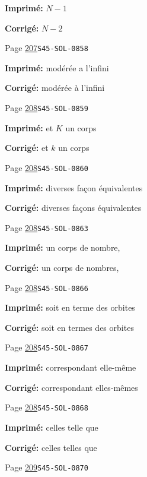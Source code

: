 \documentclass[oneside]{book}
\theoremstyle{sga-source}
\theoremstyle{sga-source-dash}
\theoremstyle{sga-source-dotdash}
\theoremstyle{sga-source-number-note-dash}
\theoremstyle{sga-source-note-number-dotdash}
\theoremstyle{sga-source-example-dotdash}
\theoremstyle{sga-source-inline-number}
\theoremstyle{sga-source-bare-number}
\theoremstyle{sga-source}
\begin{document}
\begin{description}
\par\noindent\textbf{Imprimé:} \(N-1\)
\par\noindent\textbf{Corrigé:} \(N-2\)
\smallskip
\item[\hypertarget{apparatus:FR-0204}{204}] Page \hyperlink{printpage:fr:207}{207}\quad\texttt{S45-SOL-0858}
\par\noindent\textbf{Imprimé:} modérée a l'infini
\par\noindent\textbf{Corrigé:} modérée à l'infini
\smallskip
\item[\hypertarget{apparatus:FR-0205}{205}] Page \hyperlink{printpage:fr:208}{208}\quad\texttt{S45-SOL-0859}
\par\noindent\textbf{Imprimé:} et $K$ un corps
\par\noindent\textbf{Corrigé:} et $k$ un corps
\smallskip
\item[\hypertarget{apparatus:FR-0206}{206}] Page \hyperlink{printpage:fr:208}{208}\quad\texttt{S45-SOL-0860}
\par\noindent\textbf{Imprimé:} diverses façon équivalentes
\par\noindent\textbf{Corrigé:} diverses façons équivalentes
\smallskip
\item[\hypertarget{apparatus:FR-0207}{207}] Page \hyperlink{printpage:fr:208}{208}\quad\texttt{S45-SOL-0863}
\par\noindent\textbf{Imprimé:} un corps de nombre,
\par\noindent\textbf{Corrigé:} un corps de nombres,
\smallskip
\item[\hypertarget{apparatus:FR-0208}{208}] Page \hyperlink{printpage:fr:208}{208}\quad\texttt{S45-SOL-0866}
\par\noindent\textbf{Imprimé:} soit en terme des orbites
\par\noindent\textbf{Corrigé:} soit en termes des orbites
\smallskip
\item[\hypertarget{apparatus:FR-0209}{209}] Page \hyperlink{printpage:fr:208}{208}\quad\texttt{S45-SOL-0867}
\par\noindent\textbf{Imprimé:} correspondant elle-même
\par\noindent\textbf{Corrigé:} correspondant elles-mêmes
\smallskip
\item[\hypertarget{apparatus:FR-0210}{210}] Page \hyperlink{printpage:fr:208}{208}\quad\texttt{S45-SOL-0868}
\par\noindent\textbf{Imprimé:} celles telle que
\par\noindent\textbf{Corrigé:} celles telles que
\smallskip
\item[\hypertarget{apparatus:FR-0211}{211}] Page \hyperlink{printpage:fr:209}{209}\quad\texttt{S45-SOL-0870}

\end{description}
\end{document}
